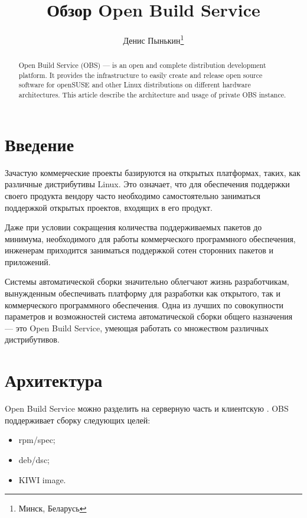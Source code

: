\documentclass[10pt, a5paper]{article}
\begin{document}
\title{Обзор Open Build Service}%

\author{Денис Пынькин\footnote{Минск, Беларусь}}
\maketitle

\begin{abstract}
Open Build Service (OBS) --- is an open and complete distribution development platform. It provides the infrastructure to easily create and release open source software for openSUSE and other Linux distributions on different hardware architectures. This article describe the architecture and usage of private OBS instance.
\end{abstract}

\section*{Введение}

Зачастую коммерческие проекты базируются на открытых платформах, таких, как различные дистрибутивы Linux. Это означает, что для обеспечения поддержки своего продукта  вендору часто необходимо самостоятельно заниматься поддержкой открытых проектов, входящих в его продукт.

Даже при условии сокращения количества поддерживаемых пакетов до минимума,  необходимого для работы коммерческого программного обеспечения, инженерам приходится заниматься поддержкой сотен сторонних пакетов и приложений.

Системы автоматической сборки значительно облегчают жизнь разработчикам, вынужденным обеспечивать платформу для разработки как открытого,  так и коммерческого программного обеспечения. Одна из лучших по совокупности параметров и возможностей система автоматической сборки общего назначения --- это Open Build Service, умеющая работать со множеством различных дистрибутивов.

\section*{Архитектура}

Open Build Service можно разделить на серверную часть и клиентскую \cite{Pynkin1}.
OBS поддерживает сборку следующих целей:

\begin{itemize}
  \item rpm/spec;
  \item deb/dsc;
  \item KIWI image.
\end{itemize}
\end{document}
